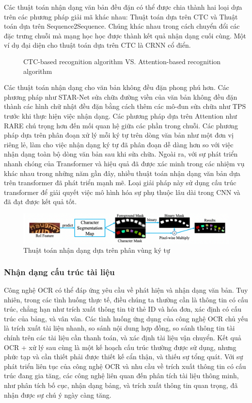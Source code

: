Các thuật toán nhận dạng văn bản đều đặn có thể được chia thành hai loại dựa trên các phương pháp giải mã khác nhau: Thuật toán dựa trên CTC và Thuật toán dựa trên Sequence2Sequence. Chúng khác nhau trong cách chuyển đổi các đặc trưng chuỗi mà mạng học học được thành kết quả nhận dạng cuối cùng. Một ví dụ đại diện cho thuật toán dựa trên CTC là CRNN cổ điển.

\begin{figure}[p]
    
    \centering
    \caption{CTC-based recognition algorithm VS. Attention-based recognition algorithm}
\end{figure}

Các thuật toán nhận dạng cho văn bản không đều đặn phong phú hơn. Các phương pháp như STAR-Net sửa chữa đường viền của văn bản không đều đặn thành các hình chữ nhật đều đặn bằng cách thêm các mô-đun sửa chữa như TPS trước khi thực hiện việc nhận dạng. Các phương pháp dựa trên Attention như RARE chú trọng hơn đến mối quan hệ giữa các phần trong chuỗi. Các phương pháp dựa trên phân đoạn xử lý mỗi ký tự trên dòng văn bản như một đơn vị riêng lẻ, làm cho việc nhận dạng ký tự đã phân đoạn dễ dàng hơn so với việc nhận dạng toàn bộ dòng văn bản sau khi sửa chữa. Ngoài ra, với sự phát triển nhanh chóng của Transformer và hiệu quả đã được xác minh trong các nhiệm vụ khác nhau trong những năm gần đây, nhiều thuật toán nhận dạng văn bản dựa trên transformer đã phát triển mạnh mẽ. Loại giải pháp này sử dụng cấu trúc transformer để giải quyết việc mô hình hóa sự phụ thuộc lâu dài trong CNN và đã đạt được kết quả tốt.

\begin{figure}
    \includegraphics[scale=0.40]{images/recognition-based-charcter-segmentation.png}
    \centering
    \caption{Thuật toán nhận dạng dựa trên phân vùng ký tự}
\end{figure}

\subsubsection{Nhận dạng cấu trúc tài liệu}
Công nghệ OCR có thể đáp ứng yêu cầu về phát hiện và nhận dạng văn bản. Tuy nhiên, trong các tình huống thực tế, điều chúng ta thường cần là thông tin có cấu trúc, chẳng hạn như trích xuất thông tin từ thẻ ID và hóa đơn, xác định có cấu trúc của bảng, và vân vân. Các tình huống ứng dụng của công nghệ OCR chủ yếu là trích xuất tài liệu nhanh, so sánh nội dung hợp đồng, so sánh thông tin tài chính trên các tài liệu cần thanh toán, và xác định tài liệu vận chuyển. Kết quả OCR + xử lý sau cùng là một kế hoạch cấu trúc thường được sử dụng, nhưng phức tạp và cần thiết phải được thiết kế cẩn thận, và thiếu sự tổng quát. Với sự phát triển liên tục của công nghệ OCR và nhu cầu về trích xuất thông tin có cấu trúc đang gia tăng, các công nghệ liên quan đến phân tích tài liệu thông minh, như phân tích bố cục, nhận dạng bảng, và trích xuất thông tin quan trọng, đã nhận được sự chú ý ngày càng tăng.

